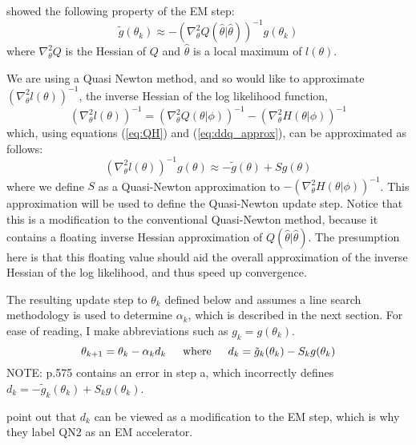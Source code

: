 \documentclass[letter,12pt]{article}
\begin{document}
\cite{jamshidianj93} showed the following property of the EM step:
\begin{equation} \label{eq:ddq_approx}
\tilde{g}(\theta_k) \approx -(\nabla^2_{\theta}Q(\hat{\theta}|\hat{\theta}))^{-1}g(\theta_k)
\end{equation}
where $\nabla^2_{\theta}Q$ is the Hessian of $Q$ and $\hat{\theta}$ is a local maximum of $l(\theta)$.  

We are using a Quasi Newton method, and so would like to approximate  $(\nabla^2_{\theta}l(\theta))^{-1}$, the inverse Hessian of the log likelihood function, 
\[
(\nabla^2_{\theta}l(\theta))^{-1}
=
(\nabla^2_{\theta}Q(\theta|\phi))^{-1}
-
(\nabla^2_{\theta}H(\theta|\phi))^{-1}
\]
which, using equations (\ref{eq:QH}) and (\ref{eq:ddq_approx}), can be approximated as follows:
\[
(\nabla^2_{\theta}l(\theta))^{-1}g(\theta)
\approx
-\tilde{g}(\theta)
+
Sg(\theta)
\]
where we define $S$ as a Quasi-Newton approximation to $-(\nabla^2_{\theta}H(\theta|\phi))^{-1}$.  This approximation will be used to define the Quasi-Newton update step.  Notice that this is a modification to the conventional Quasi-Newton method, because it contains a floating inverse Hessian approximation of $Q(\hat{\theta}|\hat{\theta})$.  The presumption here is that this floating value should aid the overall approximation of the inverse Hessian of the log likelihood, and thus speed up convergence.

The resulting update step to $\theta_k$ defined below and assumes a line search methodology is used to determine $\alpha_k$, which is described in the next section.  For ease of reading, I make abbreviations such as $g_k = g(\theta_k)$.
\[
\theta_{k+1} = \theta_k - \alpha_k d_k
\indent
\text{where}
\indent
d_k = \tilde{g}_k(\theta_k) - S_kg(\theta_k)
\]
NOTE: \cite{jamshidianj97} p.575 contains an error in step a, which incorrectly defines $d_k=-\tilde{g}_k(\theta_k) + S_kg(\theta_k)$.

\cite{jamshidianj97} point out that $d_k$ can be viewed as a modification to the EM step, which is why they label QN2 as an EM accelerator.
\end{document}
